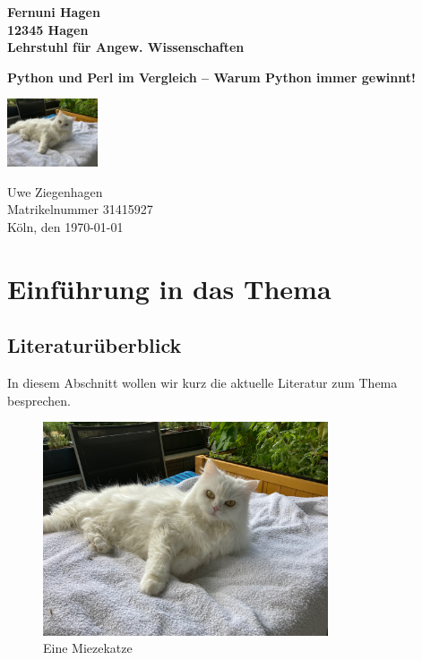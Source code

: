 \documentclass[a4paper, ngerman, 12pt,parskip=half]{scrreprt}
\begin{document}
\begin{titlepage}
{\large\textbf{Fernuni Hagen \\ 12345 Hagen \\ Lehrstuhl für Angew. Wissenschaften}}

\vspace*{4cm}

{\bfseries\huge Python und Perl im Vergleich -- Warum Python immer gewinnt! }

\begin{center}
	\includegraphics[width=0.2\textwidth]{Bilder/Katze1}
\end{center}

\vfill
Uwe Ziegenhagen \\
Matrikelnummer 31415927 \\
Köln, den \today 
\end{titlepage}

\tableofcontents
\listoffigures
\listoftables
	
\chapter{Einführung in das Thema}	
\section{Literaturüberblick}

In diesem Abschnitt wollen wir kurz die aktuelle Literatur zum Thema besprechen.	
	
\blindtext[10]

\begin{figure}
	\centering
	\includegraphics[width=0.75\textwidth]{Bilder/Katze1}
	\caption{Eine Miezekatze}\label{fig:katze1}
\end{figure}
\end{document}
